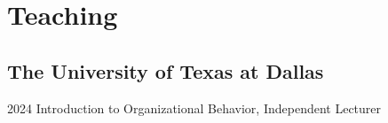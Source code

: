 \documentclass[11pt,letterpaper]{report} %
\begin{document}














    \section*{Teaching}

    \subsection*{The University of Texas at Dallas}

    \begin{tablist}

        \item[2024] \tab{}Introduction to Organizational Behavior, Independent Lecturer
        

    \end{tablist}
\end{document}
